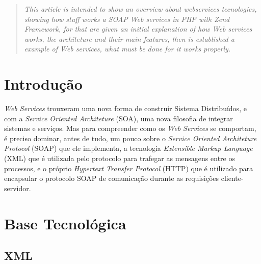 \documentclass{acm_proc_article-sp}
\begin{document}
\maketitle
\begin{abstract}

		
		
		\emph{This article is intended to show an overview about webservices tecnologies, showing how stuff works a SOAP Web services in PHP with Zend Framework, for that are given an initial explanation of how \emph{Web} services works, the architeture and their main features, then is established a example of  \emph{Web} services, what must be done for it works properly.}
			
\end{abstract}


\section{Introdução}

		\emph{Web Services} trouxeram uma nova forma de construir Sistema Distribuídos, e com a \emph{Service Oriented Architeture} (SOA), uma nova filosofia de integrar sistemas e serviços. Mas para compreender como os \emph{Web Services} se comportam, é preciso dominar, antes de tudo, um pouco sobre o \emph{Service Oriented Architeture Protocol} (SOAP) que ele implementa, a tecnologia \emph{Extensible Markup Language} (XML) que é utilizada pelo protocolo para trafegar as mensagens entre os processos, e o próprio \emph{Hypertext Transfer Protocol} (HTTP) que é utilizado para encapsular o protocolo SOAP de comunicação durante as requisições cliente-servidor.
		
\section{Base Tecnológica}
		
	\subsection{XML}
	
\end{document}
